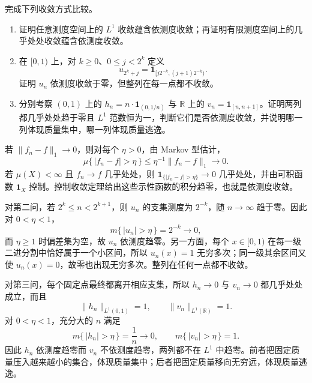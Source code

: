 \begin{exercise}\label{b1:ex:0510}
完成下列收敛方式比较。
\begin{enumerate}
\item 证明任意测度空间上的 \(L^1\) 收敛蕴含依测度收敛；再证明有限测度空间上的几乎处处收敛蕴含依测度收敛。
\item 在 \([0,1)\) 上，对 \(k\geq0\)、\(0\leq j<2^k\) 定义
\[
u_{2^k+j}=\mathbf1_{[j2^{-k},(j+1)2^{-k})}.
\]
证明 \(u_n\) 依测度收敛于零，但整列在每一点都不收敛。
\item 分别考察 \((0,1)\) 上的 \(h_n=n\cdot\mathbf1_{(0,1/n)}\) 与 \(\mathbb R\) 上的 \(v_n=\mathbf1_{[n,n+1]}\)。证明两列都几乎处处趋于零且 \(L^1\) 范数恒为一，判断它们是否依测度收敛，并说明哪一列体现质量集中，哪一列体现质量逃逸。
\end{enumerate}
\end{exercise}
\begin{solution}
若 \(\|f_n-f\|_1\to0\)，则对每个 \(\eta>0\)，由 Markov 型估计，
\[
\mu\{\,|f_n-f|>\eta\,\}
\leq\eta^{-1}\|f_n-f\|_1\longrightarrow0.
\]
若 \(\mu(X)<\infty\) 且 \(f_n\to f\) 几乎处处，则
\(\mathbf1_{\{|f_n-f|>\eta\}}\to0\) 几乎处处，并由可积函数 \(\mathbf1_X\) 控制。控制收敛定理给出这些示性函数的积分趋零，也就是依测度收敛。

对第二问，若 \(2^k\leq n<2^{k+1}\)，则 \(u_n\) 的支集测度为 \(2^{-k}\)，随 \(n\to\infty\) 趋于零。因此对 \(0<\eta<1\)，
\[
m\{\,|u_n|>\eta\,\}=2^{-k}\longrightarrow0,
\]
而 \(\eta\geq1\) 时偏差集为空，故 \(u_n\) 依测度趋零。另一方面，每个 \(x\in[0,1)\) 在每一级二进分割中恰好属于一个小区间，所以 \(u_n(x)=1\) 无穷多次；同一级其余区间又使 \(u_n(x)=0\)，故零也出现无穷多次。整列在任何一点都不收敛。

对第三问，每个固定点最终都离开相应支集，所以 \(h_n\to0\) 与 \(v_n\to0\) 都几乎处处成立，而且
\[
\|h_n\|_{L^1(0,1)}=1,
\qquad
\|v_n\|_{L^1(\mathbb R)}=1.
\]
对 \(0<\eta<1\)，充分大的 \(n\) 满足
\[
m\{\,|h_n|>\eta\,\}=\frac1n\longrightarrow0,
\qquad
m\{\,|v_n|>\eta\,\}=1.
\]
因此 \(h_n\) 依测度趋零而 \(v_n\) 不依测度趋零，两列都不在 \(L^1\) 中趋零。前者把固定质量压入越来越小的集合，体现质量集中；后者把固定质量移向无穷远，体现质量逃逸。
\end{solution}
